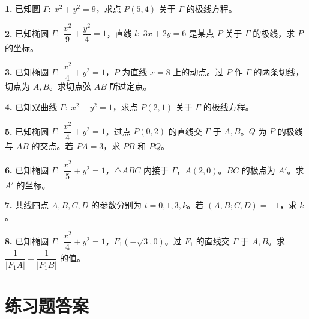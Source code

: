 \documentclass[12pt,a4paper]{ctexart}
\theoremstyle{definition}
\begin{document}
\begin{exercisebox}[练习题]

\textbf{1.} 已知圆 $\Gamma:\;x^2+y^2=9$，求点 $P(5,4)$ 关于 $\Gamma$ 的极线方程。

\medskip

\textbf{2.} 已知椭圆 $\Gamma:\;\dfrac{x^2}{9}+\dfrac{y^2}{4}=1$，直线 $l:\;3x+2y=6$ 是某点 $P$ 关于 $\Gamma$ 的极线，求 $P$ 的坐标。

\medskip

\textbf{3.} 已知椭圆 $\Gamma:\;\dfrac{x^2}{4}+y^2=1$，$P$ 为直线 $x=8$ 上的动点。过 $P$ 作 $\Gamma$ 的两条切线，切点为 $A,B$。求切点弦 $AB$ 所过定点。

\medskip

\textbf{4.} 已知双曲线 $\Gamma:\;x^2-y^2=1$，求点 $P(2,1)$ 关于 $\Gamma$ 的极线方程。

\medskip

\textbf{5.} 已知椭圆 $\Gamma:\;\dfrac{x^2}{4}+y^2=1$，过点 $P(0,2)$ 的直线交 $\Gamma$ 于 $A,B$。$Q$ 为 $P$ 的极线与 $AB$ 的交点。若 $PA=3$，求 $PB$ 和 $PQ$。

\medskip

\textbf{6.} 已知椭圆 $\Gamma:\;\dfrac{x^2}{5}+y^2=1$，$\triangle ABC$ 内接于 $\Gamma$，$A(2,0)$。$BC$ 的极点为 $A'$。求 $A'$ 的坐标。

\medskip

\textbf{7.} 共线四点 $A,B,C,D$ 的参数分别为 $t=0,1,3,k$。若 $(A,B;C,D)=-1$，求 $k$。

\medskip

\textbf{8.} 已知椭圆 $\Gamma:\;\dfrac{x^2}{4}+y^2=1$，$F_1(-\sqrt{3},0)$。过 $F_1$ 的直线交 $\Gamma$ 于 $A,B$。求 $\dfrac{1}{|F_1A|}+\dfrac{1}{|F_1B|}$ 的值。

\end{exercisebox}

\section{练习题答案}
\end{document}
